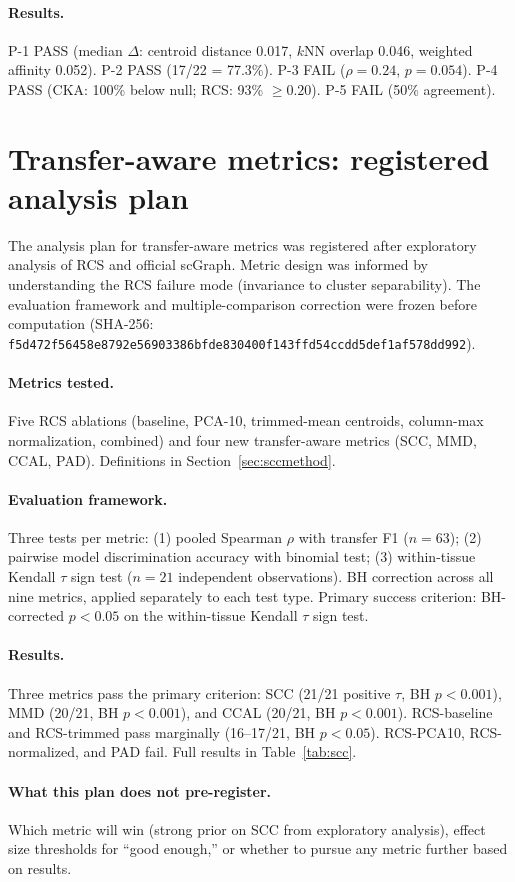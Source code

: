 \documentclass[11pt]{article}
\begin{document}
\paragraph{Results.} P-1 PASS (median $\Delta$: centroid distance
0.017, $k$NN overlap 0.046, weighted affinity 0.052). P-2 PASS (17/22
= 77.3\%). P-3 FAIL ($\rho = 0.24$, $p = 0.054$). P-4 PASS (CKA:
100\% below null; RCS: 93\% $\geq 0.20$). P-5 FAIL (50\%
agreement).


\section{Transfer-aware metrics: registered analysis plan}
\label{app:scc}

The analysis plan for transfer-aware metrics was registered after
exploratory analysis of RCS and official scGraph. Metric design was
informed by understanding the RCS failure mode (invariance to
cluster separability). The evaluation framework and multiple-comparison
correction were frozen before computation (SHA-256:
\texttt{f5d472f56458e8792e56903386bfde830400f143ffd54ccdd5def1af578dd992}).

\paragraph{Metrics tested.} Five RCS ablations (baseline, PCA-10,
trimmed-mean centroids, column-max normalization, combined) and four new
transfer-aware metrics (SCC, MMD, CCAL, PAD). Definitions in
Section~\ref{sec:sccmethod}.

\paragraph{Evaluation framework.} Three tests per metric: (1) pooled
Spearman $\rho$ with transfer F1 ($n = 63$); (2) pairwise model
discrimination accuracy with binomial test; (3) within-tissue Kendall
$\tau$ sign test ($n = 21$ independent observations). BH correction
across all nine metrics, applied separately to each test type. Primary
success criterion: BH-corrected $p < 0.05$ on the within-tissue Kendall
$\tau$ sign test.

\paragraph{Results.} Three metrics pass the primary criterion: SCC
(21/21 positive $\tau$, BH $p < 0.001$), MMD (20/21, BH $p < 0.001$),
and CCAL (20/21, BH $p < 0.001$). RCS-baseline and RCS-trimmed pass
marginally (16--17/21, BH $p < 0.05$). RCS-PCA10, RCS-normalized, and
PAD fail. Full results in Table~\ref{tab:scc}.

\paragraph{What this plan does not pre-register.} Which metric will win
(strong prior on SCC from exploratory analysis), effect size thresholds
for ``good enough,'' or whether to pursue any metric further based on
results.




\end{document}
